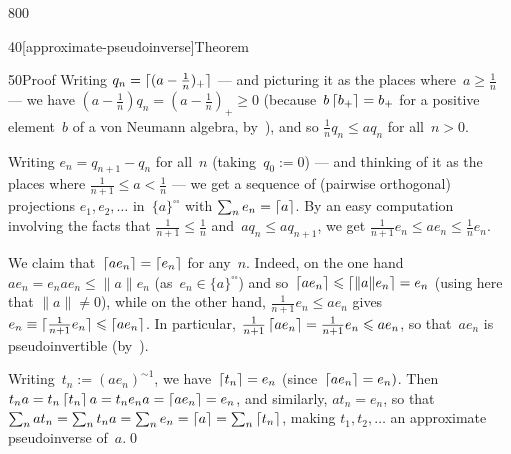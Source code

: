 \begin{parsec}{800}
\begin{point}{40}[approximate-pseudoinverse]{Theorem}
\begin{point}{50}{Proof}
Writing $q_n=
\left\lceil\smash{(a-\frac{1}{n})_+}\right\rceil$
--- and picturing it as the places where~$a\geq \frac{1}{n}$ ---
we have $(a-\frac{1}{n})q_n = (a-\frac{1}{n})_+\geq 0$
(because~$b\left\lceil b_+\right\rceil=b_+$
for a positive element~$b$ of a von Neumann algebra,
by~),
and so $\frac{1}{n}q_n \leq  aq_n$ for all~$n>0$.

Writing $e_{n}=q_{n+1}-q_n$
for all~$n$ (taking~$q_0:=0$)
--- and thinking of it as the places
where $\frac{1}{n+1}\leq a < \frac{1}{n}$ --- 
we get a sequence of (pairwise orthogonal) projections
$e_1,e_2,\dotsc$ in~$\{a\}^{\square\square}$
with $\sum_n e_n = \left\lceil a\right\rceil$.
By an easy computation
involving the facts that $\frac{1}{n+1}\leq \frac{1}{n}$
and~$aq_n\leq aq_{n+1}$,
we get $\frac{1}{n+1}e_n \leq ae_n \leq  \frac{1}{n}e_n$.

We claim that~$\left\lceil ae_n\right\rceil=\left\lceil e_n\right\rceil$ for any~$n$.
Indeed, on the one hand~$ae_n=e_nae_n\leq \|a\|e_n$
(as~$e_n\in\{a\}^{\square\square}$)
and so~$\left\lceil ae_n\right\rceil\leqslant \left\lceil\|a\|e_n\right\rceil=e_n$
(using here that $\|a\|\neq 0$),
while on the other hand, $\frac{1}{n+1}e_n\leq ae_n$
gives $e_n\equiv \left\lceil\smash{\frac{1}{n+1}e_n}\right\rceil\leqslant \left\lceil ae_n\right\rceil$.
In particular, $\frac{1}{n+1}\left\lceil ae_n\right\rceil=\frac{1}{n+1}e_n \leqslant ae_n$,
	so that~$ae_n$ is pseudoinvertible (by~).

Writing~$t_n := (ae_n)^{\sim1}$,
we have~$\left\lceil t_n\right\rceil=e_n$
(since~$\left\lceil ae_n\right\rceil=e_n)$.
Then $t_na=t_n\left\lceil t_n\right\rceil a=t_ne_na=\left\lceil ae_n\right\rceil=e_n$,
and similarly, $at_n = e_n$,
so that $\sum_n at_n = \sum_n t_n a 
=\sum_n e_n =\left\lceil a\right\rceil
= \sum_n \left\lceil t_n\right\rceil$,
making $t_1,t_2,\dotsc$ an approximate pseudoinverse of~$a$.\qed
\end{point}
\end{point}
\end{parsec}
